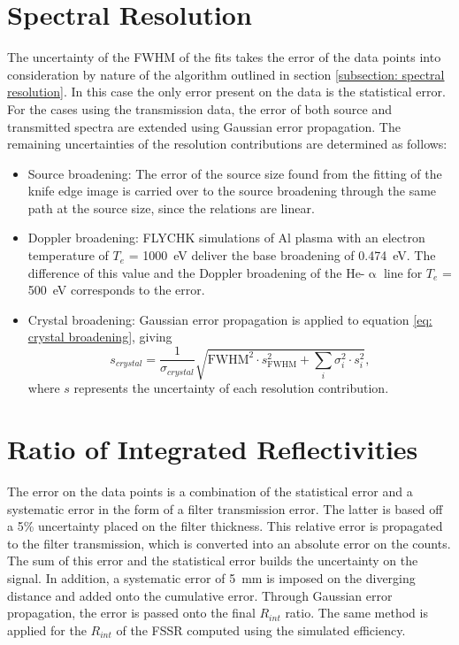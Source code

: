 \section{Spectral Resolution}

The uncertainty of the FWHM of the fits takes the error of the data points into consideration by nature of the algorithm outlined in section \ref{subsection: spectral resolution}. In this case the only error present on the data is the statistical error. For the cases using the transmission data, the error of both source and transmitted spectra are extended using Gaussian error propagation. The remaining uncertainties of the resolution contributions are determined as follows:
\begin{itemize}
	\item Source broadening: The error of the source size found from the fitting of the knife edge image is carried over to the source broadening through the same path at the source size, since the relations are linear.
	\item Doppler broadening: FLYCHK simulations of Al plasma with an electron temperature of $T_e$ = \SI{1000}{\electronvolt} deliver the base broadening of \SI{0.474}{\electronvolt}. The difference of this value and the Doppler broadening of the He-$\upalpha$ line for $T_e$ = \SI{500}{\electronvolt} corresponds to the error.
	\item Crystal broadening: Gaussian error propagation is applied to equation \ref{eq: crystal broadening}, giving
	\begin{equation}
		s_{crystal} = \frac{1}{\sigma_{crystal}}\sqrt{\text{FWHM}^2\cdot s_{\text{FWHM}}^2 + \sum_{i} \sigma_i^2\cdot s_i^2},
	\end{equation}
	where $s$ represents the uncertainty of each resolution contribution.
\end{itemize}

\section{Ratio of Integrated Reflectivities}

The error on the data points is a combination of the statistical error and a systematic error in the form of a filter transmission error. The latter is based off a 5\% uncertainty placed on the filter thickness. This relative error is propagated to the filter transmission, which is converted into an absolute error on the counts. The sum of this error and the statistical error builds the uncertainty on the signal. In addition, a systematic error of \SI{5}{\milli\meter} is imposed on the diverging distance and added onto the cumulative error. Through Gaussian error propagation, the error is passed onto the final $R_{int}$ ratio. The same method is applied for the $R_{int}$ of the FSSR computed using the simulated efficiency.

